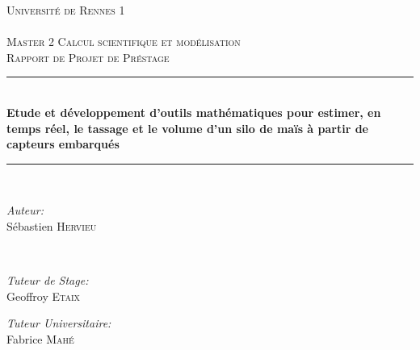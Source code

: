 \documentclass[12pt,a4paper]{report}
\author{Sébastien Hervieu}
\begin{document}
\begin{titlepage}

\newcommand{\HRule}{\rule{\linewidth}{0.5mm}} %

\center %
 

\textsc{\LARGE Université de Rennes 1}\\[1cm] 
\textsc{\Large }\\[0.5cm] %
\textsc{\large Master 2 Calcul scientifique et modélisation}\\
\textsc{Rapport de Projet de Préstage}\\

\HRule \\[0.4cm]
{ \huge \bfseries Etude et développement d’outils mathématiques pour estimer, en temps réel, le tassage et le volume d’un silo de maïs à partir de capteurs embarqués}\\[0.4cm] 
\HRule \\[1.5cm]
 

\begin{minipage}{0.4\textwidth}
\begin{flushleft} \large
\emph{Auteur:}\\
Sébastien \textsc{Hervieu}
\end{flushleft}
\end{minipage}
~
\begin{minipage}{0.4\textwidth}

\begin{flushright}
	\emph{Tuteur de Stage:} \\
	Geoffroy \textsc{Etaix}
\end{flushright}

\begin{flushright} \large
	\emph{Tuteur Universitaire:} \\
	Fabrice \textsc{Mahé} 
\end{flushright}


\end{minipage}
\end{titlepage}
\end{document}
